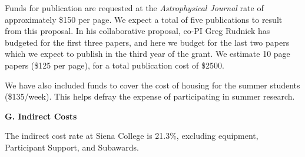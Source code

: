 \documentclass[preprint,11pt]{aastex}
\begin{document}

Funds for publication are requested at the {\it Astrophysical Journal} rate of approximately \$150 per page.
We expect a total of five publications to result from this proposal.
In his collaborative proposal, co-PI Greg Rudnick has budgeted for the
first three papers, and here we budget for the last two papers which
we expect to publish in the third year of the grant.  We estimate 10
page papers (\$125 per page), for a total publication cost of \$2500.

We have also included funds to cover the cost of housing for the
summer students (\$135/week).  This helps defray the expense of
participating in summer research.






\begin{center}
{\bf \large G. Indirect Costs}
\end{center}

The indirect cost rate at Siena College is 21.3\%, excluding
equipment, Participant Support, and Subawards.  
\end{document}
